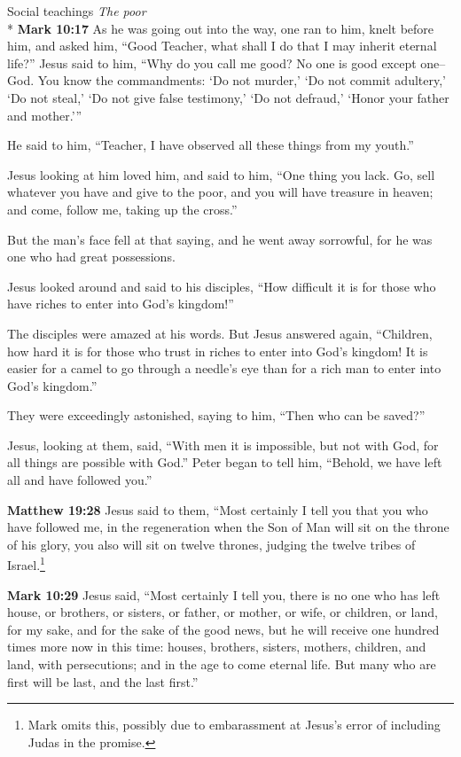 \documentclass[10pt,twoside]{article} %
\newcommand{\quotesize}{\normalsize{}}
\newenvironment{quotetext}{\begingroup\quotesize}{\endgroup}
\newcommand{\intex}[1]{\index[texts]{#1}}
\newcommand{\bible}[2]{\begin{quotetext}\textbf{#1}\intex{#1} #2\end{quotetext}}
\newcommand{\matthew}[2]{\bible{Matthew #1}{#2}}
\newcommand{\gospelmark}[2]{\bible{Mark #1}{#2}}
\newcommand{\subhead}[1]{\emph{#1}\\*}
\begin{document}
\begin{section}{Social teachings}
\subhead{The poor}
\gospelmark{10:17}{
As he was going out into the way, one ran to him, knelt before him, and asked him, ``Good Teacher, what shall I do that I may inherit eternal life?''
  Jesus said to him, ``Why do you call me good? No one is good except one--God.    You know the commandments: `Do not murder,' `Do not commit adultery,' `Do not steal,' `Do not give false testimony,' `Do not defraud,' `Honor your father and mother.'{}''

  He said to him, ``Teacher, I have observed all these things from my youth.''

  Jesus looking at him loved him, and said to him, ``One thing you lack. Go, sell whatever you have and give to the poor, and you will have treasure in heaven; and come, follow me, taking up the cross.''

  But the man's face fell at that saying, and he went away sorrowful, for he was one who had great possessions.

  Jesus looked around and said to his disciples, ``How difficult it is for those who have riches to enter into God's kingdom!''

  The disciples were amazed at his words. But Jesus answered again, ``Children, how hard it is for those who trust in riches to enter into God's kingdom!    It is easier for a camel to go through a needle's eye than for a rich man to enter into God's kingdom.''

  They were exceedingly astonished, saying to him, ``Then who can be saved?''

  Jesus, looking at them, said, ``With men it is impossible, but not with God, for all things are possible with God.'' 
 Peter began to tell him, ``Behold, we have left all and have followed you.''
}

\matthew{19:28}{
Jesus said to them, ``Most certainly I tell you that you who have followed me, in the regeneration when the Son of Man will sit on the throne of his glory, you also will sit on twelve thrones, judging the twelve tribes of Israel.\footnote{Mark omits this, possibly due to  embarassment
at Jesus's error of including Judas in the promise.}
}

\gospelmark{10:29}{
  Jesus said, ``Most certainly I tell you, there is no one who has left house, or brothers, or sisters, or father, or mother, or wife, or children, or land, for my sake, and for the sake of the good news,    but he will receive one hundred times more now in this time: houses, brothers, sisters, mothers, children, and land, with persecutions; and in the age to come eternal life.    But many who are first will be last, and the last first.'' }

\end{section}
\end{document}
